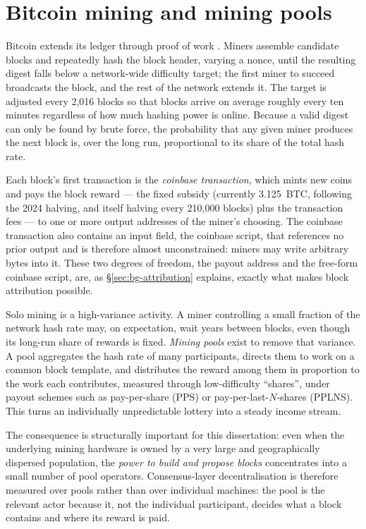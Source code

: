 \documentclass[logo,msc]{infthesis}           %
\begin{document}
\section{Bitcoin mining and mining pools}
\label{sec:bg-mining}
 
Bitcoin extends its ledger through proof of work \cite{nakamoto2008bitcoin}.
Miners assemble candidate blocks and repeatedly hash the block header, varying
a nonce, until the resulting digest falls below a network-wide difficulty
target; the first miner to succeed broadcasts the block, and the rest of the
network extends it. The target is adjusted every 2{,}016 blocks so that blocks
arrive on average roughly every ten minutes regardless of how much hashing
power is online. Because a valid digest can only be found by brute force, the
probability that any given miner produces the next block is, over the long run,
proportional to its share of the total hash rate.
 
Each block's first transaction is the \emph{coinbase transaction}, which mints
new coins and pays the block reward --- the fixed subsidy (currently 3.125~BTC,
following the 2024 halving, and itself halving every 210{,}000 blocks) plus the
transaction fees --- to one or more output addresses of the miner's choosing.
The coinbase transaction also contains an input field, the coinbase script,
that references no prior output and is therefore almost unconstrained: miners
may write arbitrary bytes into it. These two degrees of freedom, the payout
address and the free-form coinbase script, are, as
\S\ref{sec:bg-attribution} explains, exactly what makes block attribution
possible.
 
Solo mining is a high-variance activity. A miner controlling a small fraction
of the network hash rate may, on expectation, wait years between blocks, even
though its long-run share of rewards is fixed. \emph{Mining pools} exist to
remove that variance. A pool aggregates the hash rate of many participants,
directs them to work on a common block template, and distributes the reward
among them in proportion to the work each contributes, measured through
low-difficulty ``shares'', under payout schemes such as pay-per-share (PPS)
or pay-per-last-$N$-shares (PPLNS). This turns an individually unpredictable
lottery into a steady income stream.
 
The consequence is structurally important for this dissertation: even when the
underlying mining hardware is owned by a very large and geographically
dispersed population, the \emph{power to build and propose blocks} concentrates
into a small number of pool operators. Consensus-layer decentralisation is
therefore measured over pools rather than over individual machines: the pool
is the relevant actor because it, not the individual participant, decides what
a block contains and where its reward is paid.
 
\end{document}
